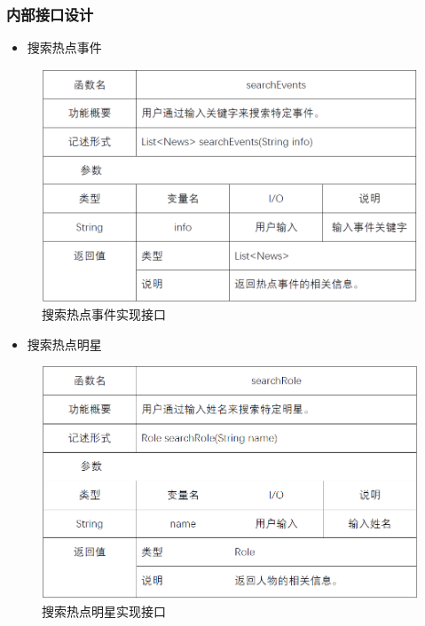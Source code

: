 \subsubsection{内部接口设计}
\begin{itemize} 
	\item 搜索热点事件
\end{itemize}
\begin{figure}[!htbp]
	\centering
	\includegraphics[scale=0.7]{image/b5.png} %
	\caption{搜索热点事件实现接口} %
\end{figure}
\begin{itemize}
	\item 搜索热点明星
\end{itemize}
\begin{figure}[!htbp]
	\centering
	\includegraphics[scale=0.7]{image/b6.png} %
	\caption{搜索热点明星实现接口} %
\end{figure}
